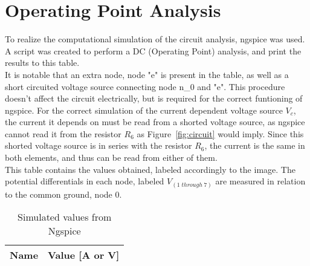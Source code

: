 \section{Operating Point Analysis}
\label{sec:simulation}

To realize the computational simulation of the circuit analysis, ngspice was used. A script was created to perform a DC (Operating Point) analysis, and print the results to this table.\\
It is notable that an extra node, node "e" is present in the table, as well as a short circuited voltage source connecting node n\_0 and "e". This procedure doesn't affect the circuit electrically, but is required for the correct funtioning of ngspice. For the correct simulation of the current dependent voltage source $V_{c}$, the current it depends on must be read from a shorted voltage source, as ngspice cannot read it from the resistor $R_{6}$ as Figure~\ref{fig:circuit} would imply. Since this shorted voltage source is in series with the resistor $R_{6}$, the current is the same in both elements, and thus can be read from either of them.\\

This table contains the values obtained, labeled accordingly to the image. The potential differentials in each node, labeled $V_{(1 \; through \; 7)}$ are measured in relation to the common ground, node 0. 

\begin{table}[h]
  \centering
  \begin{tabular}{|l|r|}
    \hline    
    {\bf Name} & {\bf Value [A or V]} \\ \hline
    
  \end{tabular}
  \caption{Simulated values from Ngspice}
  \label{tab:op}
\end{table}



